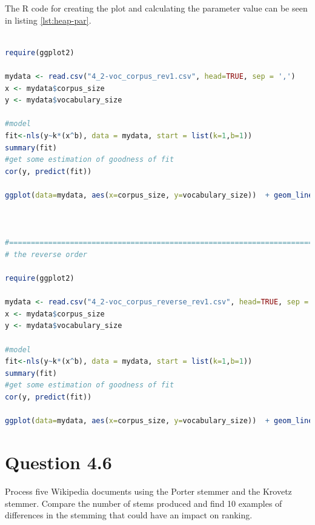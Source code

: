\documentclass[letterpaper,11pt]{article}
\begin{document}
The R code for creating the plot and calculating the parameter value can be seen in listing \ref{lst:heap-par}.

\begin{lstlisting}[language=R, caption={Code for plotting vocabulary growth and calculating the Heap's parameter}, label={lst:heap-par}]

require(ggplot2)

mydata <- read.csv("4_2-voc_corpus_rev1.csv", head=TRUE, sep = ',')
x <- mydata$corpus_size
y <- mydata$vocabulary_size

#model
fit<-nls(y~k*(x^b), data = mydata, start = list(k=1,b=1))
summary(fit)
#get some estimation of goodness of fit
cor(y, predict(fit))

ggplot(data=mydata, aes(x=corpus_size, y=vocabulary_size))  + geom_line(aes(group = 1, color="Actual")) + geom_line(data=mydata, aes(x=corpus_size, y=predict(fit), color="Heaps")) + labs(title='Vocabulary Growth for Wikipedia documents',x = 'Words in Collection', y = 'Words in Vocabulary') + scale_colour_manual(name='', values=c('Actual'='#000099', 'Heaps'='#CC0000'), guide='legend')



#=======================================================================
# the reverse order

require(ggplot2)

mydata <- read.csv("4_2-voc_corpus_reverse_rev1.csv", head=TRUE, sep = ',')
x <- mydata$corpus_size
y <- mydata$vocabulary_size

#model
fit<-nls(y~k*(x^b), data = mydata, start = list(k=1,b=1))
summary(fit)
#get some estimation of goodness of fit
cor(y, predict(fit))

ggplot(data=mydata, aes(x=corpus_size, y=vocabulary_size))  + geom_line(aes(group = 1, color="Actual")) + geom_line(data=mydata, aes(x=corpus_size, y=predict(fit), color="Heaps")) + labs(title='Vocabulary Growth for Wikipedia documents (reversed order)',x = 'Corpus Size', y = 'Vocabulary Size') + scale_colour_manual(name='', values=c('Actual'='#000099', 'Heaps'='#CC0000'), guide='legend')


\end{lstlisting}

\noindent\makebox[\linewidth]{\rule{\textwidth}{0.4pt}}

\section*{Question 4.6}
\begin{spverbatim}
Process five Wikipedia documents using the Porter stemmer and the Krovetz stemmer. Compare the number of stems produced and find 10 examples of differences in the stemming that could have an impact on ranking.
\end{spverbatim}
\end{document}
